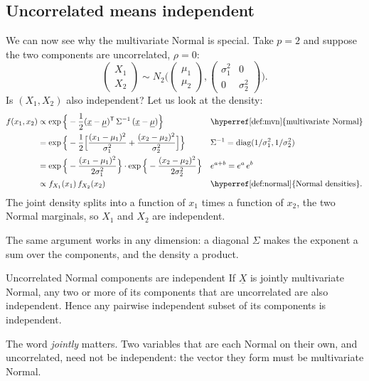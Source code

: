 \documentclass[a4paper,12pt,oneside]{report}
\begin{document}
\subsection{Uncorrelated means independent}\label{sec:mvn-independence}

We can now see why the multivariate Normal is special. Take $p=2$ and
suppose the two components are uncorrelated, $\rho=0$:
\[
\begin{pmatrix}X_1\\ X_2\end{pmatrix}\sim N_2\bigg(\begin{pmatrix}\mu_1\\ \mu_2\end{pmatrix},
\begin{pmatrix}\sigma_1^2&0\\ 0&\sigma_2^2\end{pmatrix}\bigg).
\]
Is $(X_1,X_2)$ also independent? Let us look at the density:
\begin{align*}
f(x_1,x_2)
&\propto\exp\Big\{-\frac12(\underline{x}-\underline{\mu})^{\mathsf T}\,\Sigma^{-1}\,(\underline{x}-\underline{\mu})\Big\}
&&\text{\hyperref[def:mvn]{multivariate Normal}}\\
&=\exp\Big\{-\frac12\Big[\frac{(x_1-\mu_1)^2}{\sigma_1^2}+\frac{(x_2-\mu_2)^2}{\sigma_2^2}\Big]\Big\}
&&\text{$\Sigma^{-1}=\mathrm{diag}(1/\sigma_1^2,1/\sigma_2^2)$}\\
&=\exp\Big\{-\frac{(x_1-\mu_1)^2}{2\sigma_1^2}\Big\}\cdot\exp\Big\{-\frac{(x_2-\mu_2)^2}{2\sigma_2^2}\Big\}
&&\text{$e^{a+b}=e^a\,e^b$}\\
&\propto f_{X_1}(x_1)\,f_{X_2}(x_2)
&&\text{\hyperref[def:normal]{Normal densities}.}
\end{align*}
The joint density splits into a function of $x_1$ times a function of
$x_2$, the two Normal marginals, so $X_1$ and $X_2$ are independent.

The same argument works in any dimension: a diagonal $\Sigma$ makes the
exponent a sum over the components, and the density a product.

\begin{framedprop}{Uncorrelated Normal components are independent}\label{prop:mvn-independence}
If $\underline{X}$ is jointly multivariate Normal, any two or more of its
components that are uncorrelated are also independent. Hence any pairwise
independent subset of its components is independent.
\end{framedprop}

The word \emph{jointly} matters. Two variables that are each Normal on
their own, and uncorrelated, need not be independent: the vector they form
must be multivariate Normal.
\end{document}
